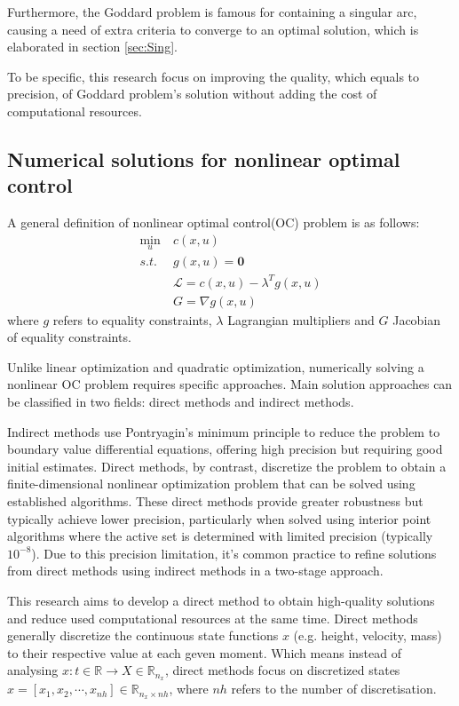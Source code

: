 \documentclass{article}
\begin{document}
Furthermore, the Goddard problem is famous for containing a singular arc, causing a need of extra criteria to converge to an optimal solution, which is elaborated in section \ref{sec:Sing}.

To be specific, this research focus on improving the quality, which equals to precision, of Goddard problem's solution without adding the cost of computational resources.

\subsection{Numerical solutions for nonlinear optimal control}
\label{sec:NuS}
A general definition of nonlinear optimal control(OC) problem is as follows:
\begin{align*}
    \min_u \ &c(x,u) \\ s.t.\ &g(x,u)=\mathbf{0}\\ &\mathcal{L}=c(x,u)-\lambda^T g(x,u) \\ & G = \nabla g(x,u)
\end{align*}
where $g$ refers to equality constraints, $\lambda$ Lagrangian multipliers and $G$ Jacobian of equality constraints.

Unlike linear optimization and quadratic optimization, numerically solving a nonlinear OC problem requires specific approaches. Main solution approaches can be classified in two fields: direct methods and indirect methods\cite{Betts}.

Indirect methods use Pontryagin's minimum principle to reduce the problem to boundary value differential equations, offering high precision but requiring good initial estimates. Direct methods, by contrast, discretize the problem to obtain a finite-dimensional nonlinear optimization problem that can be solved using established algorithms. These direct methods provide greater robustness but typically achieve lower precision, particularly when solved using interior point algorithms where the active set is determined with limited precision (typically $10^{-8}$).
Due to this precision limitation, it's common practice to refine solutions from direct methods using indirect methods in a two-stage approach. 

This research aims to develop a direct method to obtain high-quality solutions and reduce used computational resources at the same time. Direct methods generally discretize the continuous state functions $x$ (e.g. height, velocity, mass) to their respective value at each geven moment. Which means instead of analysing $x: t\in \mathbb{R}\rightarrow X\in\mathbb{R}_{n_x}$, direct methods focus on discretized states $x=\left[x_1,x_2,\cdots,x_{nh}\right]\in \mathbb{R}_{n_x \times nh}$, where $nh$ refers to the number of discretisation. 
\end{document}
